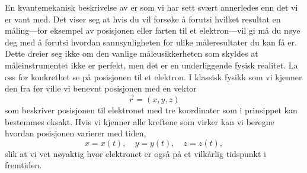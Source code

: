 En kvantemekanisk beskrivelse av er som vi har sett svært annerledes enn det vi er vant med. Det viser seg at hvis du vil forsøke å forutsi hvilket resultat en måling---for eksempel av posisjonen eller farten til et elektron---vil gi må du nøye deg med å forutsi hvordan sannsynligheten for ulike måleresultater du kan få er. Dette dreier seg ikke om den vanlige måleusikkerheten som skyldes at måleinstrumentet ikke er perfekt, men det er en underliggende fysisk realitet. La oss for konkrethet se på posisjonen til et elektron. I klassisk fysikk som vi kjenner den fra før ville vi benevnt posisjonen med en vektor
\begin{displaymath}
	\vec{r} = (x,y,z)
\end{displaymath}
som beskriver posisjonen til elektronet med tre koordinater som i prinsippet kan bestemmes eksakt. Hvis vi kjenner alle kreftene som virker kan vi beregne hvordan posisjonen varierer med tiden,
\begin{displaymath}
	x = x(t),\quad y = y(t),\quad z=z(t),
\end{displaymath}
slik at vi vet nøyaktig hvor elektronet er også på et vilkårlig tidspunkt i fremtiden.

